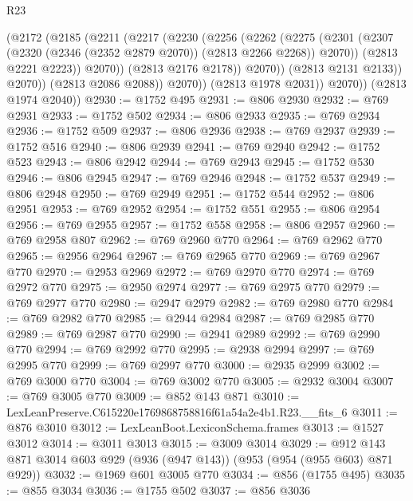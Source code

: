 \begin{lexlean}{R23}
\begin{coremodule}
                    (@2172
                      (@2185
                        (@2211
                          (@2217
                            (@2230
                              (@2256
                                (@2262
                                  (@2275
                                    (@2301
                                      (@2307
                                        (@2320 (@2346 (@2352 @2879 @2070)) (@2813 @2266 @2268))
                                        @2070))
                                    (@2813 @2221 @2223))
                                  @2070))
                              (@2813 @2176 @2178))
                            @2070))
                        (@2813 @2131 @2133))
                      @2070))
                  (@2813 @2086 @2088))
                @2070))
            (@2813 @1978 @2031))
          @2070))
      (@2813 @1974 @2040))
@2930 := @1752 @495
@2931 := @806 @2930
@2932 := @769 @2931
@2933 := @1752 @502
@2934 := @806 @2933
@2935 := @769 @2934
@2936 := @1752 @509
@2937 := @806 @2936
@2938 := @769 @2937
@2939 := @1752 @516
@2940 := @806 @2939
@2941 := @769 @2940
@2942 := @1752 @523
@2943 := @806 @2942
@2944 := @769 @2943
@2945 := @1752 @530
@2946 := @806 @2945
@2947 := @769 @2946
@2948 := @1752 @537
@2949 := @806 @2948
@2950 := @769 @2949
@2951 := @1752 @544
@2952 := @806 @2951
@2953 := @769 @2952
@2954 := @1752 @551
@2955 := @806 @2954
@2956 := @769 @2955
@2957 := @1752 @558
@2958 := @806 @2957
@2960 := @769 @2958 @807
@2962 := @769 @2960 @770
@2964 := @769 @2962 @770
@2965 := @2956 @2964
@2967 := @769 @2965 @770
@2969 := @769 @2967 @770
@2970 := @2953 @2969
@2972 := @769 @2970 @770
@2974 := @769 @2972 @770
@2975 := @2950 @2974
@2977 := @769 @2975 @770
@2979 := @769 @2977 @770
@2980 := @2947 @2979
@2982 := @769 @2980 @770
@2984 := @769 @2982 @770
@2985 := @2944 @2984
@2987 := @769 @2985 @770
@2989 := @769 @2987 @770
@2990 := @2941 @2989
@2992 := @769 @2990 @770
@2994 := @769 @2992 @770
@2995 := @2938 @2994
@2997 := @769 @2995 @770
@2999 := @769 @2997 @770
@3000 := @2935 @2999
@3002 := @769 @3000 @770
@3004 := @769 @3002 @770
@3005 := @2932 @3004
@3007 := @769 @3005 @770
@3009 := @852 @143 @871
@3010 := LexLeanPreserve.C615220e1769868758816f61a54a2e4b1.R23.__fits_6
@3011 := @876 @3010
@3012 := LexLeanBoot.LexiconSchema.frames
@3013 := @1527 @3012
@3014 := @3011 @3013
@3015 := @3009 @3014
@3029 := @912 @143 @871 @3014 @603 @929 (@936 (@947 @143)) (@953 (@954 (@955 @603) @871 @929))
@3032 := @1969 @601 @3005 @770
@3034 := @856 (@1755 @495)
@3035 := @855 @3034
@3036 := @1755 @502
@3037 := @856 @3036

\end{coremodule}
\end{lexlean}
